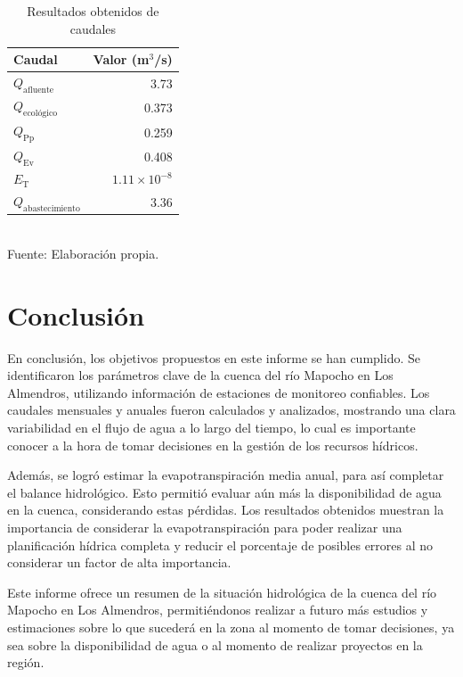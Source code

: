 \documentclass{article} %
\begin{document}
\begin{table}[h]
    \centering
    \caption{Resultados obtenidos de caudales}
    \vspace{0.2cm}
    \begin{tabular}{lr}
        \toprule
        \textbf{Caudal} & \textbf{Valor (m\(^3\)/s)} \\
        \midrule
        \(Q_{\text{afluente}}\) & 3.73 \\
        \(Q_{\text{ecológico}}\) & 0.373 \\
        \(Q_{\text{Pp}}\) & 0.259 \\
        \(Q_{\text{Ev}}\) & 0.408 \\
        \(E_{\text{T}}\) & \(1.11 \times 10^{-8}\) \\
        \(Q_{\text{abastecimiento}}\) & 3.36 \\
        \bottomrule
    \end{tabular}
    \vspace{0.2cm}
    \\Fuente: Elaboración propia.
\end{table}

\newpage
\section{Conclusión}
En conclusión, los objetivos propuestos en este informe se han cumplido. Se identificaron los parámetros clave de la cuenca del río Mapocho en Los Almendros, utilizando información de estaciones de monitoreo confiables. Los caudales mensuales y anuales fueron calculados y analizados, mostrando una clara variabilidad en el flujo de agua a lo largo del tiempo, lo cual es importante conocer a la hora de tomar decisiones en la gestión de los recursos hídricos.

Además, se logró estimar la evapotranspiración media anual, para así completar el balance hidrológico. Esto permitió evaluar aún más la disponibilidad de agua en la cuenca, considerando estas pérdidas. Los resultados obtenidos muestran la importancia de considerar la evapotranspiración para poder realizar una planificación hídrica completa y reducir el porcentaje de posibles errores al no considerar un factor de alta importancia.

Este informe ofrece un resumen de la situación hidrológica de la cuenca del río Mapocho en Los Almendros, permitiéndonos realizar a futuro más estudios y estimaciones sobre lo que sucederá en la zona al momento de tomar decisiones, ya sea sobre la disponibilidad de agua o al momento de realizar proyectos en la región.

\end{document}
